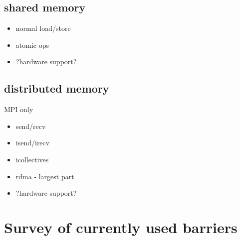\documentclass[a4paper, 10pt]{article}
\begin{document}
\subsection{shared memory}
\begin{itemize}
	\item normal load/store
	\item atomic ops
	\item ?hardware support?
\end{itemize}

\subsection{distributed memory}
MPI only
\begin{itemize}
	\item send/recv
	\item isend/irecv
	\item icollectives
	\item rdma - largest part
	\item ?hardware support?
\end{itemize}

\section{Survey of currently used barriers}
\end{document}
